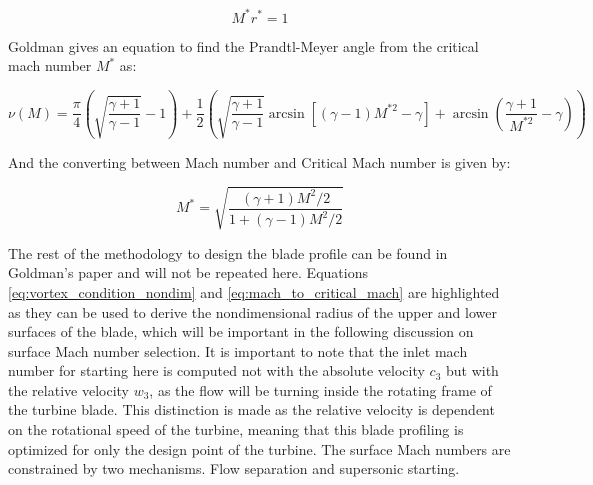 \begin{equation}
    M^* r^* = 1
    \label{eq:vortex_condition_nondim}
\end{equation}

Goldman gives an equation \cite{goldmanAnalyticalInvestigationSupersonic1968} to find the Prandtl-Meyer angle from the critical mach number $M^*$ as:

\begin{equation}
\nu(M) = \frac{\pi}{4}\left(\sqrt{\frac{\gamma+1}{\gamma-1}} - 1\right) + \frac{1}{2}\left(\sqrt{\frac{\gamma+1}{\gamma-1}} \arcsin\left[(\gamma-1)M^{*2} - \gamma\right] + \arcsin\left(\frac{\gamma+1}{M^{*2}} - \gamma\right)\right)
\label{eq:prandtl_meyer_angle}
\end{equation}

And the converting between Mach number and Critical Mach number is given by:

\begin{equation}
M^* = \sqrt{\frac{(\gamma+1)M^2/2}{1 + (\gamma-1)M^2/2}}
\label{eq:mach_to_critical_mach}
\end{equation}

The rest of the methodology to design the blade profile can be found in Goldman's paper \cite{goldmanAnalyticalInvestigationSupersonic1968} and will not be repeated here. Equations \cref{eq:vortex_condition_nondim} and \cref{eq:mach_to_critical_mach} are highlighted as they can be used to derive the nondimensional radius of the upper and lower surfaces of the blade, which will be important in the following discussion on surface Mach number selection. It is important to note that the inlet mach number for starting here is computed not with the absolute velocity $c_3$ but with the relative velocity $w_3$, as the flow will be turning inside the rotating frame of the turbine blade. This distinction is made as the relative velocity is dependent on the rotational speed of the turbine, meaning that this blade profiling is optimized for only the design point of the turbine. The surface Mach numbers are constrained by two mechanisms. Flow separation and supersonic starting.






